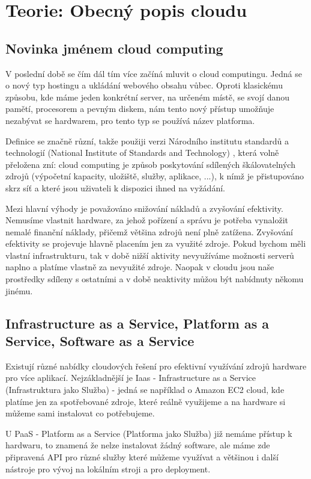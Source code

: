 \chapter{Teorie: Obecný popis cloudu}

\section{Novinka jménem cloud computing}
V poslední době se čím dál tím více začíná mluvit o cloud computingu. Jedná se o nový typ hostingu a ukládání webového obsahu vůbec. Oproti klasickému způsobu, kde máme jeden konkrétní server, na určeném místě, se svojí danou pamětí, procesorem a pevným diskem, nám tento nový přístup umožňuje nezabývat se hardwarem, pro tento typ se používá název platforma. 

Definice se značně různí, takže použiji verzi Národního institutu standardů a technologií (National Institute of Standards and Technology) \cite{nist-cloud},
která volně přeložena zní: cloud computing je způsob poskytování sdílených škálovatelných zdrojů (výpočetní kapacity, uložiště, služby, aplikace, ...), k nímž je přistupováno skrz síť a které jsou uživateli k dispozici ihned na vyžádání. 

Mezi hlavní výhody je považováno snižování nákladů a zvyšování efektivity. Nemusíme vlastnit hardware, za jehož pořízení a správu je potřeba vynaložit nemalé finanční náklady, přičemž většina zdrojů není plně zatížena. Zvyšování efektivity se projevuje hlavně placením jen za využité zdroje. Pokud bychom měli vlastní infrastrukturu, tak v době nižší aktivity nevyužíváme možnosti serverů naplno a platíme vlastně za nevyužité zdroje. Naopak v cloudu jsou naše prostředky sdíleny s ostatními a v době neaktivity můžou být nabídnuty někomu jinému.

\section{Infrastructure as a Service, Platform as a Service, Software as a Service}
Existují různé nabídky cloudových řešení pro efektivní využívání zdrojů hardware pro více aplikací. Nejzákladnější je Iaas - Infrastructure as a Service (Infrastruktura jako Služba) - jedná se například o Amazon EC2 \cite{amazon-ec2} cloud, kde platíme jen za spotřebované zdroje, které reálně využijeme a na hardware si můžeme sami instalovat co potřebujeme. 

U PaaS - Platform as a Service  (Platforma jako Služba) již nemáme přístup k hardwaru, to znamená že nelze instalovat žádný software, ale máme zde připravená API pro různé služby které můžeme využívat a většinou i další nástroje pro vývoj na lokálním stroji a pro deployment.

